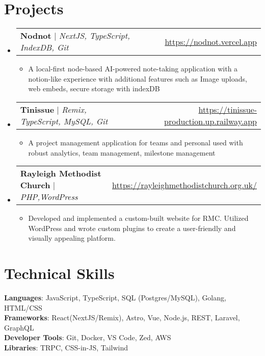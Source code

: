 \documentclass[letterpaper,11pt]{article}
\makeatletter
\newcommand{\resumeItem}[1]{
  \item\small{
    {#1 \vspace{-2pt}}
  }
}
\newcommand{\resumeProjectHeading}[2]{
    \item
    \begin{tabular*}{0.97\textwidth}{l@{\extracolsep{\fill}}r}
      \small#1 & #2 \\
    \end{tabular*}\vspace{-7pt}
}
\newcommand{\resumeSubHeadingListStart}{\begin{itemize}[leftmargin=0.15in, label={}]}
\newcommand{\resumeSubHeadingListEnd}{\end{itemize}}
\newcommand{\resumeItemListStart}{\begin{itemize}}
\newcommand{\resumeItemListEnd}{\end{itemize}\vspace{-5pt}}
\makeatother
\begin{document}
\section{Projects}
    \resumeSubHeadingListStart
      \resumeProjectHeading
          {\textbf{Nodnot} $|$ \emph{NextJS, TypeScript, IndexDB, Git}}{\url{https://nodnot.vercel.app}}
          \resumeItemListStart
            \resumeItem{A local-first node-based AI-powered note-taking application with a notion-like experience with additional features such as Image uploads, web embeds, secure storage with indexDB}
          \resumeItemListEnd
      \resumeProjectHeading
          {\textbf{Tinissue} $|$ \emph{Remix, TypeScript, MySQL, Git}}{\url{https://tinissue-production.up.railway.app}}
          \resumeItemListStart
            \resumeItem{A project management application for teams and personal used with robust analytics, team management, milestone management}
          \resumeItemListEnd
      \resumeProjectHeading
          {\textbf{Rayleigh Methodist Church} $|$ \emph{PHP,WordPress}}{\url{https://rayleighmethodistchurch.org.uk/}}
          \resumeItemListStart
            \resumeItem{Developed and implemented a custom-built website for RMC. Utilized WordPress and wrote custom plugins to create a user-friendly and visually appealing platform. }
          \resumeItemListEnd
    \resumeSubHeadingListEnd



\section{Technical Skills}
 \begin{itemize}[leftmargin=0.15in, label={}]
    \small{\item{
     \textbf{Languages}{: JavaScript, TypeScript, SQL (Postgres/MySQL), Golang, HTML/CSS} \\
     \textbf{Frameworks}{: React(NextJS/Remix), Astro, Vue, Node.js, REST, Laravel, GraphQL} \\
     \textbf{Developer Tools}{: Git, Docker, VS Code, Zed,  AWS} \\
     \textbf{Libraries}{: TRPC, CSS-in-JS, Tailwind}
    }}
 \end{itemize}


\end{document}
